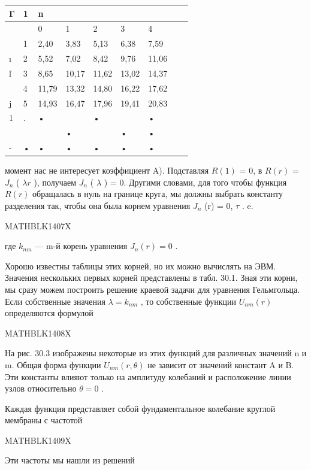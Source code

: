 \documentclass[
]{article}
\newcounter{none} %
\begin{document}
{{{{\def\LTcaptype{none} %
\begin{longtable}[]{@{}lllllllll@{}}
\toprule\noalign{}
Γ & 1 & n & & & & & & \\
\midrule\noalign{}
\endhead
\bottomrule\noalign{}
\endlastfoot
& & 0 & 1 & 2 & 3 & 4 & & \\
& 1 & 2,40 & 3,83 & 5,13 & 6,38 & 7,59 & & \\
ı & 2 & 5,52 & 7,02 & 8,42 & 9,76 & 11,06 & & \\
ľ & 3 & 8,65 & 10,17 & 11,62 & 13,02 & 14,37 & & \\
& 4 & 11,79 & 13,32 & 14,80 & 16,22 & 17,62 & & \\
j & 5 & 14,93 & 16,47 & 17,96 & 19,41 & 20,83 & & \\
1 & . & • & & • & & • & & \\
& & & • & & • & • & & \\
- & • & • & • & • & • & • & & \\
\end{longtable}
}

момент нас не интересует коэффициент A). Подставляя \(R (1)\) = 0, в
\(R (r)\) = \(J_n\) ( \(\lambda r\) ), получаем \(J_n\) ( \(\lambda\) )
= 0. Другими словами, для того чтобы функция \(R (r)\) обращалась в нуль
на границе круга, мы должны выбрать константу разделения так, чтобы она
была корнем уравнения \(J_n\) (r) = 0, \(\tau\) . e.

MATHBLK1407X

где \(k_{nm}\) --- m-й корень уравнения \(J_n(r) = 0\) .

Хорошо известны таблицы этих корней, но их можно вычислять на ЭВМ.
Значения нескольких первых корней представлены в табл. 30.1. Зная эти
корни, мы сразу можем построить решение краевой задачи для уравнения
Гельмгольца. Если собственные значения \(\lambda = k_{nm}\) , то
собственные функции \(U_{ nm}(r)\) определяются формулой

MATHBLK1408X

На рис. 30.3 изображены некоторые из этих функций для различных значений
n и m. Общая форма функции \(U_{nm}(r,\theta)\) не зависит от значений
констант A и B. Эти константы влияют только на амплитуду колебаний и
расположение линии узлов относительно \(\theta=0\) .

Каждая функция представляет собой фундаментальное колебание круглой
мембраны с частотой

MATHBLK1409X

Эти частоты мы нашли из решений

}}}
\end{document}
